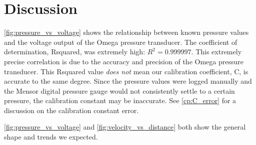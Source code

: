\chapter{Discussion}
\label{cp:discussion}

\autoref{fig:pressure_vs_voltage} shows the relationship between known pressure values and the voltage output of the Omega pressure transducer. The coefficient of determination, \gls{Rsquared}, was extremely high: $R^2 = 0.999997$. This extremely precise correlation is due to the accuracy and precision of the Omega pressure transducer. This \gls{Rsquared} value \textit{does not} mean our calibration coefficient, \gls{C}, is accurate to the same degree. Since the pressure values were logged manually and the Mensor digital pressure gauge would not consistently settle to a certain pressure, the calibration constant may be inaccurate. See \autoref{cp:C_error} for a discussion on the calibration constant error.

\autoref{fig:pressure_vs_voltage} and \autoref{fig:velocity_vs_distance} both show the general shape and trends we expected. 

